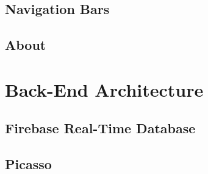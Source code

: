 \subsection{Navigation Bars}
\subsection{About}

\section{Back-End Architecture}
\subsection{Firebase Real-Time Database}
\subsection{Picasso}